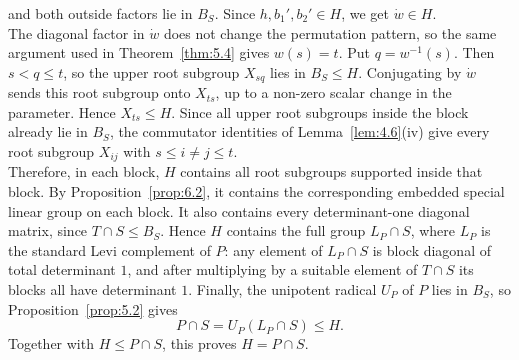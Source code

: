 \documentclass[../Odyssey_Project.tex]{subfiles}
\begin{document}
\begin{solution}
\[\]
and both outside factors lie in $B_S$. Since $h,b_1',b_2'\in H$, we get $\dot{w}\in H$.\\
The diagonal factor in $\dot{w}$ does not change the permutation pattern, so the same argument used in Theorem~\ref{thm:5.4} gives $w(s)=t$. Put $q=w^{-1}(s)$. Then $s<q\leq t$, so the upper root subgroup $X_{sq}$ lies in $B_S\leq H$. Conjugating by $\dot{w}$ sends this root subgroup onto $X_{ts}$, up to a non-zero scalar change in the parameter. Hence $X_{ts}\leq H$. Since all upper root subgroups inside the block already lie in $B_S$, the commutator identities of Lemma~\ref{lem:4.6}(iv) give every root subgroup $X_{ij}$ with $s\leq i\neq j\leq t$.\\
Therefore, in each block, $H$ contains all root subgroups supported inside that block. By Proposition~\ref{prop:6.2}, it contains the corresponding embedded special linear group on each block. It also contains every determinant-one diagonal matrix, since $T\cap S\leq B_S$. Hence $H$ contains the full group $L_P\cap S$, where $L_P$ is the standard Levi complement of $P$: any element of $L_P\cap S$ is block diagonal of total determinant $1$, and after multiplying by a suitable element of $T\cap S$ its blocks all have determinant $1$. Finally, the unipotent radical $U_P$ of $P$ lies in $B_S$, so Proposition~\ref{prop:5.2} gives
\[
    P\cap S=U_P(L_P\cap S)\leq H.
\]
Together with $H\leq P\cap S$, this proves $H=P\cap S$.
\end{solution}
\end{document}

